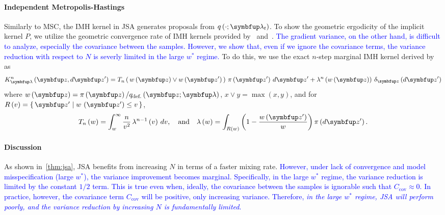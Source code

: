 \paragraph{Independent Metropolis-Hastings}
Similarly to MSC, the IMH kernel in JSA generates proposals from \(q\left(\cdot; \vlambda_t\right)\).
To show the geometric ergodicity of the implicit kernel \(P\), we utilize the geometric convergence rate of IMH kernels provided by~\citet[Theorem 2.1]{10.2307/2242610} and~\citet{wang_exact_2020}.
\textcolor{blue}{
The gradient variance, on the other hand, is difficult to analyze, especially the covariance between the samples.
However, we show that, even if we ignore the covariance terms, the variance reduction with respect to \(N\) is severly limited in the large \(w^*\) regime.
}
To do this, we use the exact \(n\)-step marginal IMH kernel derived by~\citet{Smith96exacttransition} as
{
  \begin{align}
  K^n_{\vlambda}\left(\vz, d\vz^{\prime}\right) 
  = T_n\left(\, w\left(\vz\right) \vee w\left(\vz^{\prime}\right)\,\right) \, \pi\left(\vz^{\prime}\right) \, d\vz^{\prime}
  + \lambda^n\left(w\left(\vz\right)\right) \, \delta_{\vz}\left(d\vz^{\prime}\right)
  \label{eq:imh_exact_kernel}
  \end{align}
}%
where {\(w\left(\vz\right) = \pi\left(\vz\right)/q_{\text{def.}}\left(\vz; \vlambda\right)\), \(x \vee y = \max\left(x, y\right)\)}, and for {\(R\left(v\right) = \{\, \vz^{\prime} \mid w\,\left(\vz^{\prime}\right) \leq v \,\}\)}, 
{%
  \begin{align}
    T_n\left(w\right)      = \int_w^{\infty}
    \frac{n}{v^2}
    \, \lambda^{n-1}\left(v\right)\,dv,
    \quad\text{and}\quad
    \lambda\left(w\right) =
    \int_{R\left(w\right)}
    \left( 1 - \frac{w\left(\vz^{\prime}\right)}{w}  \right)
    \pi\left(d\vz^{\prime}\right).\label{eq:T_lambda}
  \end{align}
}%


%
\vspace{-1.5ex}
\paragraph{Discussion}
As shown in~\cref{thm:jsa}, JSA benefits from increasing \(N\) in terms of a faster mixing rate.
\textcolor{blue}{
However,  under lack of convergence and model misspecification (large \(w^*\)), the variance improvement becomes marginal.
Specifically, in the large \(w^*\) regime, the variance reduction is limited by the constant \(1/2\) term.
This is true even when, ideally, the covariance between the samples is ignorable such that \(C_{\text{cov}} \approx 0\).
In practice, however, the covariance term \(C_{\text{cov}}\) will be positive, only increasing variance.
Therefore, \textit{in the large \(w^*\) regime, JSA will perform poorly, and the variance reduction by increasing \(N\) is fundamentally limited}.
}

